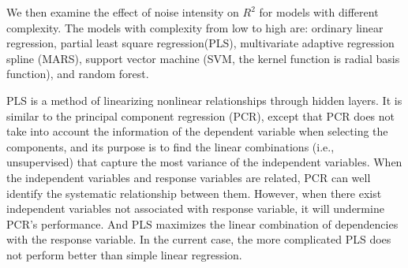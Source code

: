 \documentclass[12pt,]{krantz}
\makeatletter
\newenvironment{Shaded}{\begin{snugshade}}{\end{snugshade}}
\newcommand{\CommentTok}[1]{\textcolor[rgb]{0.37,0.37,0.37}{\textit{#1}}}
\newcommand{\ControlFlowTok}[1]{\textcolor[rgb]{0.27,0.27,0.27}{\textbf{#1}}}
\newcommand{\DataTypeTok}[1]{\textcolor[rgb]{0.27,0.27,0.27}{#1}}
\newcommand{\DecValTok}[1]{\textcolor[rgb]{0.06,0.06,0.06}{#1}}
\newcommand{\KeywordTok}[1]{\textcolor[rgb]{0.27,0.27,0.27}{\textbf{#1}}}
\newcommand{\NormalTok}[1]{#1}
\newcommand{\OperatorTok}[1]{\textcolor[rgb]{0.43,0.43,0.43}{\textbf{#1}}}
\newcommand{\StringTok}[1]{\textcolor[rgb]{0.5,0.5,0.5}{#1}}
\newenvironment{kframe}{%
\medskip{}
\setlength{\fboxsep}{.8em}
 \def\at@end@of@kframe{}%
 \ifinner\ifhmode%
  \def\at@end@of@kframe{\end{minipage}}%
  \begin{minipage}{\columnwidth}%
 \fi\fi%
 \def\FrameCommand##1{\hskip\@totalleftmargin \hskip-\fboxsep
 \colorbox{shadecolor}{##1}\hskip-\fboxsep
     \hskip-\linewidth \hskip-\@totalleftmargin \hskip\columnwidth}%
 \MakeFramed {\advance\hsize-\width
   \@totalleftmargin\z@ \linewidth\hsize
   \@setminipage}}%
 {\par\unskip\endMakeFramed%
 \at@end@of@kframe}
\renewenvironment{Shaded}{\begin{kframe}}{\end{kframe}}
\makeatother
\begin{document}
We then examine the effect of noise intensity on \(R^2\) for models with different complexity. The models with complexity from low to high are: ordinary linear regression, partial least square regression(PLS), multivariate adaptive regression spline (MARS), support vector machine (SVM, the kernel function is radial basis function), and random forest.

\begin{Shaded}
\end{Shaded}

PLS is a method of linearizing nonlinear relationships through hidden layers. It is similar to the principal component regression (PCR), except that PCR does not take into account the information of the dependent variable when selecting the components, and its purpose is to find the linear combinations (i.e., unsupervised) that capture the most variance of the independent variables. When the independent variables and response variables are related, PCR can well identify the systematic relationship between them. However, when there exist independent variables not associated with response variable, it will undermine PCR's performance. And PLS maximizes the linear combination of dependencies with the response variable. In the current case, the more complicated PLS does not perform better than simple linear regression.
\end{document}
